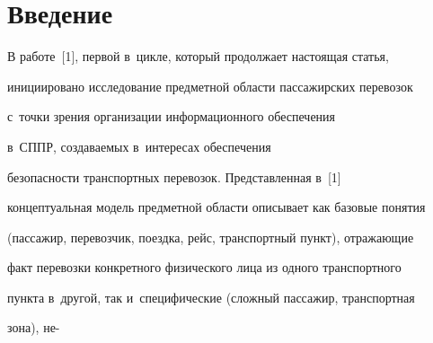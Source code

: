 














 \thispagestyle{headings}





 \vspace*{-15pt}





\section{Введение}





 \vspace*{-2pt}





 В работе~[1], первой в~цикле, который продолжает настоящая статья, 


инициировано исследование предметной области пассажирских перевозок 


с~точки зрения организации информационного обеспечения 


в~СППР, создаваемых в~интересах обеспечения 


безопасности транспортных перевозок. Представленная в~[1] 


концептуальная модель предметной области описывает как базовые понятия 


(пассажир, перевозчик, поездка, рейс, транспортный пункт), отражающие 


факт перевозки конкретного физического лица из одного транспортного 


пункта в~другой, так и~специфические (сложный пассажир, транспортная 


зона), не-\linebreak


\vspace*{-12pt}





